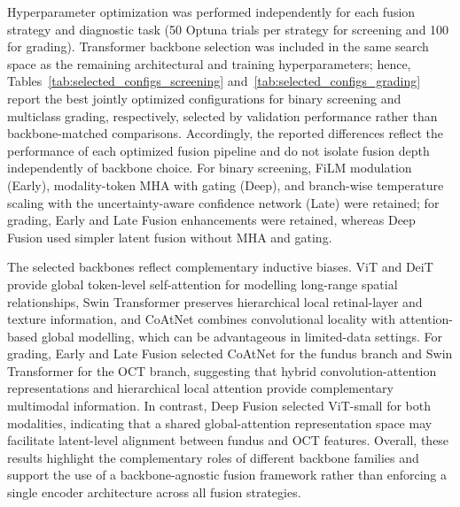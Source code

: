 \documentclass{ieeeaccess}
\begin{document}
Hyperparameter optimization was performed independently for each fusion strategy and diagnostic task (50 Optuna trials per strategy for screening and 100 for grading). Transformer backbone selection was included in the same search space as the remaining architectural and training hyperparameters; hence, Tables~\ref{tab:selected_configs_screening} and~\ref{tab:selected_configs_grading} report the best jointly optimized configurations for binary screening and multiclass grading, respectively, selected by validation performance rather than backbone-matched comparisons. Accordingly, the reported differences reflect the performance of each optimized fusion pipeline and do not isolate fusion depth independently of backbone choice.
For binary screening, FiLM modulation (Early), modality-token MHA with gating (Deep), and branch-wise temperature scaling with the uncertainty-aware confidence network (Late) were retained; for grading, Early and Late Fusion enhancements were retained, whereas Deep Fusion used simpler latent fusion without MHA and gating.

The selected backbones reflect complementary inductive biases. ViT and DeiT provide global token-level self-attention for modelling long-range spatial relationships, Swin Transformer preserves hierarchical local retinal-layer and texture information, and CoAtNet combines convolutional locality with attention-based global modelling, which can be advantageous in limited-data settings. For grading, Early and Late Fusion selected CoAtNet for the fundus branch and Swin Transformer for the OCT branch, suggesting that hybrid convolution-attention representations and hierarchical local attention provide complementary multimodal information. In contrast, Deep Fusion selected ViT-small for both modalities, indicating that a shared global-attention representation space may facilitate latent-level alignment between fundus and OCT features. Overall, these results highlight the complementary roles of different backbone families and support the use of a backbone-agnostic fusion framework rather than enforcing a single encoder architecture across all fusion strategies.
\end{document}
